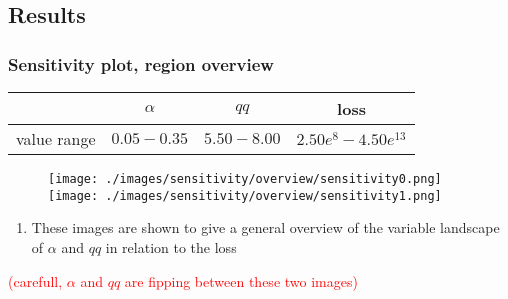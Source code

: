 \documentclass{beamer}
\begin{document}
\subsection{Results}
\begin{frame}
	\frametitle{Sensitivity plot, region overview}
	\begin{center}
		\begin{tabular}{|c|c|c|c|}
			\hline & $\alpha$ & $qq$ & loss \\
			\hline value range & $0.05-0.35$ & $5.50-8.00$ & $2.50e^{8}-4.50e^{13}$\\
			\hline
		\end{tabular}
		\vspace{-0.2cm}
		\begin{figure}
				\hspace{-1.3cm}
				\texttt{[image: ./images/sensitivity/overview/sensitivity0.png]}\hspace{-1.0cm}%
				\texttt{[image: ./images/sensitivity/overview/sensitivity1.png]}
		\end{figure}
	\begin{enumerate}[$\bullet$]
		\item \vspace{-0.6cm}These images are shown to give a general overview of the variable landscape of $\alpha$ and $qq$ in relation to the loss
	\end{enumerate}
	\textcolor{red}{\vspace{0.5cm}\tiny{(carefull, $\alpha$ and $qq$ are fipping between these two images)}}
	\end{center}
\end{frame}
\end{document}
